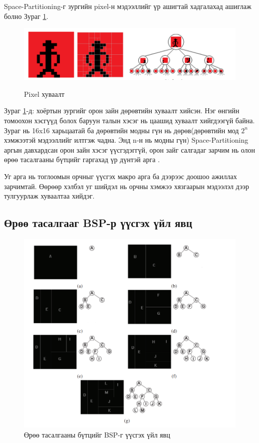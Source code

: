 Space-Partitioning-г зургийн pixel-н мэдээллийг үр ашигтай хадгалахад ашиглаж болно Зураг \ref{fig:PixelPartition}.
\begin{figure}[t]
	\centering
	\caption{Pixel хуваалт}
	\includegraphics[width=\textwidth]{./images/pixel_partition.png}
	\label{fig:PixelPartition}
\end{figure}

Зураг \ref{fig:PixelPartition}-д: хоёртын зургийг орон зайн дөрөвтийн хуваалт хийсэн. Нэг өнгийн томоохон хэсгүүд болох баруун талын хэсэг нь цаашид хуваалт хийгдээгүй байна. Зураг нь 16x16 харьцаатай ба дөрөвтийн модны гүн нь дөрөв(дөрөвтийн мод \(2^n\) хэмжээтэй мэдээллийг илтгэж чадна. Энд n-н нь модны гүн)
Space-Partitioning аргын давхардсан орон зайн хэсэг үүсгэдэггүй, орон зайг салгадаг зарчим нь олон өрөө тасалгааны бүтцийг гаргахад үр дүнтэй арга \cite{PCGinGames2016}.

Уг арга нь тоглоомын орчныг үүсгэх макро арга ба дээрээс доошоо ажиллах зарчимтай. Өөрөөр хэлбэл уг шийдэл нь орчны хэмжээ хязгаарын мэдээлэл дээр тулгуурлаж хуваалтаа хийдэг.
\subsection{Өрөө тасалгааг BSP-р үүсгэх үйл явц}
\begin{figure}[H]
	\centering
	\includegraphics[width=\textwidth]{./images/BSP.png}
	\caption{Өрөө тасалгааны бүтцийг BSP-г үүсгэх үйл явц}
	\label{fig:BSP}
\end{figure}

